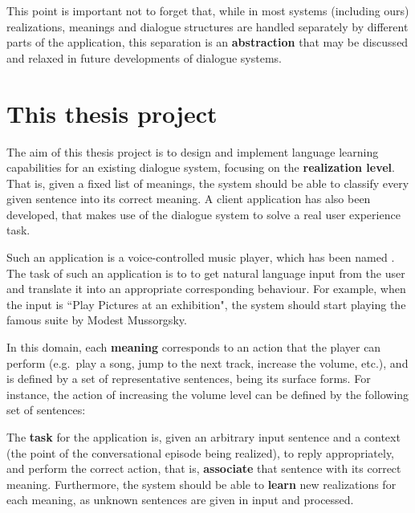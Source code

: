This point is important not to forget that, while in most systems (including ours) realizations, meanings and dialogue structures are handled separately by different parts of the application, this separation is an \textbf{abstraction} that may be discussed and relaxed in future developments of dialogue systems.


\section{This thesis project} \label{ch:intro:project}

The aim of this thesis project is to design and implement language learning capabilities for an existing dialogue system, focusing on the \textbf{realization level}. That is, given a fixed list of meanings, the system should be able to classify every given sentence into its correct meaning. A client application has also been developed, that makes use of the dialogue system to solve a real user experience task.

Such an application is a voice-controlled music player, which has been named \textbf{\pname}. The task of such an application is to to get natural language input from the user and translate it into an appropriate corresponding behaviour. For example, when the input is ``Play Pictures at an exhibition", the system should start playing the famous suite by Modest Mussorgsky.

In this domain, each \textbf{meaning} corresponds to an action that the player can perform (e.g.\ play a song, jump to the next track, increase the volume, etc.), and is defined by a set of representative sentences, being its surface forms. For instance, the action of increasing the volume level can be defined by the following set of sentences:
\vspace{-0.6cm}
\vspace{-0.6cm}
\vspace{-0.6cm}

The \textbf{task} for the application is, given an arbitrary input sentence and a context (the point of the conversational episode being realized), to reply appropriately, and perform the correct action, that is, \textbf{associate} that sentence with its correct meaning. Furthermore, the system should be able to \textbf{learn} new realizations for each meaning, as unknown sentences are given in input and processed.

